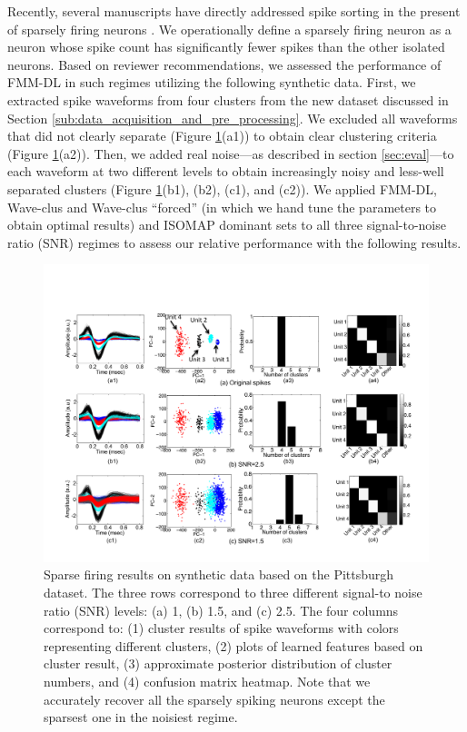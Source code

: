 \documentclass[journal]{IEEEtran}
\begin{document}
Recently, several manuscripts have directly addressed spike sorting in the present of sparsely firing neurons \cite{Pedreira2012, Adamos2012}.  We operationally define a sparsely  firing neuron as a neuron whose spike count has significantly fewer spikes than the other isolated neurons.
% 
Based on reviewer recommendations, we assessed the performance of FMM-DL in such regimes utilizing the following synthetic data.  First, we extracted spike waveforms from four clusters from the new dataset discussed in Section \ref{sub:data_acquisition_and_pre_processing}.  We excluded all waveforms that did not clearly separate (Figure \ref{fig:Sparse_firing_neuron}(a1))
to obtain clear clustering criteria (Figure \ref{fig:Sparse_firing_neuron}(a2)).  Then, 
we added real noise---as described in section \ref{sec:eval}---to each waveform at two different levels to obtain increasingly noisy and less-well separated clusters (Figure \ref{fig:Sparse_firing_neuron}(b1), (b2), (c1), and (c2)).  We applied FMM-DL, Wave-clus \cite{Pedreira2012} and Wave-clus ``forced'' (in which we hand tune the parameters to obtain optimal results) and ISOMAP dominant sets \cite{Adamos2012} to all three signal-to-noise ratio (SNR) regimes to assess our relative performance with the following results.

\begin{figure}[!htbp]
\centering

   \includegraphics[width=1.0\linewidth]{figs_new/fig8cropped.pdf}
  \caption{{
Sparse firing results on synthetic data based on the Pittsburgh dataset. 
The three rows correspond to three different signal-to noise ratio (SNR) levels: (a) 1, (b) 1.5, and (c) 2.5. The four columns correspond to: (1) cluster results of spike waveforms with colors representing different clusters, (2) plots of learned features  based on cluster result, (3) approximate posterior distribution of cluster numbers, and (4) confusion matrix heatmap. 
Note that we accurately recover all the sparsely spiking neurons except the sparsest one in the noisiest regime.
   }} \vspace{-10pt}
   \label{fig:Sparse_firing_neuron}
\end{figure}
\end{document}
